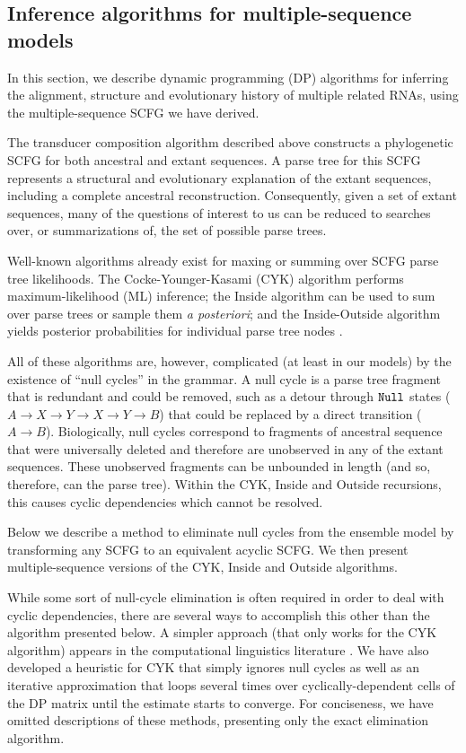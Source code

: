 \documentclass[10pt]{article}
\begin{document}
\subsection*{Inference algorithms for multiple-sequence models}

In this section, we describe dynamic programming (DP) algorithms for
inferring the alignment, structure and evolutionary history
of multiple related RNAs, using the multiple-sequence SCFG we have derived.

The transducer composition algorithm described above constructs a phylogenetic SCFG
for both ancestral and extant sequences.
A parse tree for this SCFG represents a structural and evolutionary
explanation of the extant sequences, including a complete ancestral reconstruction.
Consequently, given a set of extant sequences, many of the questions of interest to us
can be reduced to searches over, or summarizations of, the set of possible parse trees.

Well-known algorithms already exist for maxing or summing over SCFG parse tree likelihoods.
The Cocke-Younger-Kasami (CYK) algorithm performs maximum-likelihood (ML) inference;
the Inside algorithm can be used to sum over parse trees or sample them {\em a posteriori};
and the Inside-Outside algorithm yields posterior probabilities for individual parse tree nodes \cite{Durbin98}.

All of these algorithms are, however, complicated (at least in our models) by
the existence of ``null cycles'' in the grammar.
A null cycle is a parse tree fragment that is redundant and could be removed, such as a detour through $\mathtt{Null}$ states ($A \to X \to Y \to X \to Y \to B$)
that could be replaced by a direct transition ($A \to B$).
Biologically, null cycles correspond to fragments of ancestral sequence that were universally deleted and therefore
are unobserved in any of the extant sequences.
These unobserved fragments can be unbounded in length (and so, therefore, can the parse tree).
Within the CYK, Inside and Outside recursions, this causes cyclic dependencies which cannot be resolved.

Below we describe a method to eliminate null cycles from
the ensemble model by transforming any SCFG to an equivalent acyclic SCFG.
We then present multiple-sequence versions of the CYK, Inside and Outside algorithms.

While some sort of null-cycle elimination is often required in order
to deal with cyclic dependencies, there are several ways to accomplish
this other than the algorithm presented below.  A simpler approach
(that only works for the CYK algorithm) appears in the computational
linguistics literature \cite{GecsegSteinby97}.  We have also developed
a heuristic for CYK that simply ignores null cycles as well as an
iterative approximation that loops several times over
cyclically-dependent cells of the DP matrix until the estimate starts
to converge. For conciseness, we have omitted descriptions of these
methods, presenting only the exact elimination algorithm.
\end{document}
